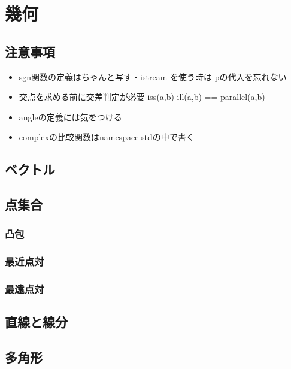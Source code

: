 \section{幾何}

\subsection{注意事項}
\begin{itemize}
\setlength{\parskip}{0cm} %
\setlength{\itemsep}{0cm} %
\item sgn関数の定義はちゃんと写す・istream を使う時は pの代入を忘れない
\item 交点を求める前に交差判定が必要 iss(a,b) ill(a,b) == parallel(a,b)
\item angleの定義には気をつける
\item complexの比較関数はnamespace stdの中で書く
\end{itemize}

\subsection{ベクトル}

\subsection{点集合}

\subsubsection{凸包}

\subsubsection{最近点対}

\subsubsection{最遠点対}

\subsection{直線と線分}

\subsection{多角形}

